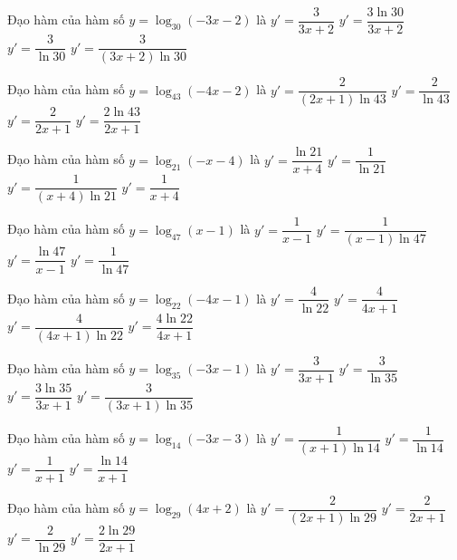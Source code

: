 \documentclass[12pt,a4paper]{article}
\begin{document}
\begin{ex}
Đạo hàm của hàm số $y=\log_{30}(-3x-2)$ là
\choice
{$y'=\dfrac{3}{3x+2}$}
{$y'=\dfrac{3\ln{30}}{3x+2}$}
{$y'=\dfrac{3}{\ln{30}}$}
{\True $y'=\dfrac{3}{(3x+2)\ln 30}$}
\end{ex}
\begin{ex}
Đạo hàm của hàm số $y=\log_{43}(-4x-2)$ là
\choice
{\True $y'=\dfrac{2}{(2x+1)\ln 43}$}
{$y'=\dfrac{2}{\ln{43}}$}
{$y'=\dfrac{2}{2x+1}$}
{$y'=\dfrac{2\ln{43}}{2x+1}$}
\end{ex}
\begin{ex}
Đạo hàm của hàm số $y=\log_{21}(-x-4)$ là
\choice
{$y'=\dfrac{\ln{21}}{x+4}$}
{$y'=\dfrac{1}{\ln{21}}$}
{\True $y'=\dfrac{1}{(x+4)\ln 21}$}
{$y'=\dfrac{1}{x+4}$}
\end{ex}
\begin{ex}
Đạo hàm của hàm số $y=\log_{47}(x-1)$ là
\choice
{$y'=\dfrac{1}{x-1}$}
{\True $y'=\dfrac{1}{(x-1)\ln 47}$}
{$y'=\dfrac{\ln{47}}{x-1}$}
{$y'=\dfrac{1}{\ln{47}}$}
\end{ex}
\begin{ex}
Đạo hàm của hàm số $y=\log_{22}(-4x-1)$ là
\choice
{$y'=\dfrac{4}{\ln{22}}$}
{$y'=\dfrac{4}{4x+1}$}
{\True $y'=\dfrac{4}{(4x+1)\ln 22}$}
{$y'=\dfrac{4\ln{22}}{4x+1}$}
\end{ex}
\begin{ex}
Đạo hàm của hàm số $y=\log_{35}(-3x-1)$ là
\choice
{$y'=\dfrac{3}{3x+1}$}
{$y'=\dfrac{3}{\ln{35}}$}
{$y'=\dfrac{3\ln{35}}{3x+1}$}
{\True $y'=\dfrac{3}{(3x+1)\ln 35}$}
\end{ex}
\begin{ex}
Đạo hàm của hàm số $y=\log_{14}(-3x-3)$ là
\choice
{\True $y'=\dfrac{1}{(x+1)\ln 14}$}
{$y'=\dfrac{1}{\ln{14}}$}
{$y'=\dfrac{1}{x+1}$}
{$y'=\dfrac{\ln{14}}{x+1}$}
\end{ex}
\begin{ex}
Đạo hàm của hàm số $y=\log_{29}(4x+2)$ là
\choice
{\True $y'=\dfrac{2}{(2x+1)\ln 29}$}
{$y'=\dfrac{2}{2x+1}$}
{$y'=\dfrac{2}{\ln{29}}$}
{$y'=\dfrac{2\ln{29}}{2x+1}$}
\end{ex}
\end{document}

